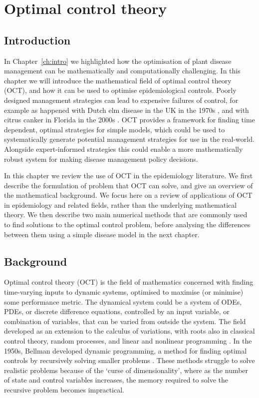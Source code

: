 %
\chapter{Optimal control theory}\label{ch:oct}

\section{Introduction}\label{sec:ch2:intro}

In Chapter~\ref{ch:intro} we highlighted how the optimisation of plant disease management can be mathematically and computationally challenging. In this chapter we will introduce the mathematical field of optimal control theory (OCT), and how it can be used to optimise epidemiological controls. Poorly designed management strategies can lead to expensive failures of control, for example as happened with Dutch elm disease in the UK in the 1970s \citep{tomlinson_too_2010}, and with citrus canker in Florida in the 2000s \citep{gottwald_citrus_2007}. OCT provides a framework for finding time dependent, optimal strategies for simple models, which could be used to systematically generate potential management strategies for use in the real-world. Alongside expert-informed strategies this could enable a more mathematically robust system for making disease management policy decisions.

In this chapter we review the use of OCT in the epidemiology literature. We first describe the formulation of problem that OCT can solve, and give an overview of the mathematical background. We focus here on a review of applications of OCT in epidemiology and related fields, rather than the underlying mathematical theory. We then describe two main numerical methods that are commonly used to find solutions to the optimal control problem, before analysing the differences between them using a simple disease model in the next chapter.

\section{Background}\label{sec:ch2:background}

Optimal control theory (OCT) is the field of mathematics concerned with finding time-varying inputs to dynamic systems, optimised to maximise (or minimise) some performance metric. The dynamical system could be a system of ODEs, PDEs, or discrete difference equations, controlled by an input variable, or combination of variables, that can be varied from outside the system. The field developed as an extension to the calculus of variations, with roots also in classical control theory, random processes, and linear and nonlinear programming \citep{bryson_optimal_1996}. In the 1950s, Bellman developed dynamic programming, a method for finding optimal controls by recursively solving smaller problems \citep{bellman_dynamic_1957}. These methods struggle to solve realistic problems because of the `curse of dimensionality', where as the number of state and control variables increases, the memory required to solve the recursive problem becomes impractical.

